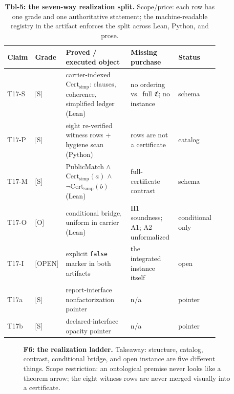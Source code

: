 \documentclass[11pt]{article}
\newcommand{\gradeS}{\textsf{[S]}}
\newcommand{\gradeO}{\textsf{[O]}}
\newcommand{\gradeOpen}{\textsf{[OPEN]}}
\newcommand{\Cpkg}{\mathfrak{C}}
\newcommand{\Certsimp}{\mathrm{Cert}_{\mathrm{simp}}}
\theoremstyle{definition}
\begin{document}
\begin{table}[t]
\centering\small
\begin{tabular}{p{0.09\linewidth}p{0.08\linewidth}p{0.3\linewidth}p{0.22\linewidth}p{0.17\linewidth}}
\toprule
Claim & Grade & Proved / executed object & Missing purchase & Status \\
\midrule
T17-S & \gradeS & carrier-indexed $\Certsimp$: clauses, coherence, simplified ledger (Lean) & no ordering vs.\ full $\Cpkg$; no instance & schema \\
T17-P & \gradeS & eight re-verified witness rows + hygiene scan (Python) & rows are not a certificate & catalog \\
T17-M & \gradeS & PublicMatch $\wedge$ $\Certsimp(a)$ $\wedge$ $\neg\Certsimp(b)$ (Lean) & full-certificate contrast & schema \\
T17-O & \gradeO & conditional bridge, uniform in carrier (Lean) & H1 soundness; A1; A2 unformalized & conditional only \\
T17-I & \gradeOpen & explicit \texttt{false} marker in both artifacts & the integrated instance itself & open \\
T17a & \gradeS & report-interface nonfactorization pointer & n/a & pointer \\
T17b & \gradeS & declared-interface opacity pointer & n/a & pointer \\
\bottomrule
\end{tabular}
\caption{\textbf{Tbl-5: the seven-way realization split.} Scope/price: each
row has one grade and one authoritative statement; the machine-readable
registry in the artifact enforces the split across Lean, Python, and prose.}
\label{tbl:t17}
\end{table}

\begin{figure}[t]
\centering
{}
\caption{\textbf{F6: the realization ladder.} Takeaway: structure, catalog,
contrast, conditional bridge, and open instance are five different things.
Scope restriction: an ontological premise never looks like a theorem arrow;
the eight witness rows are never merged visually into a certificate.}
\label{fig:ladder}
\end{figure}
\end{document}
